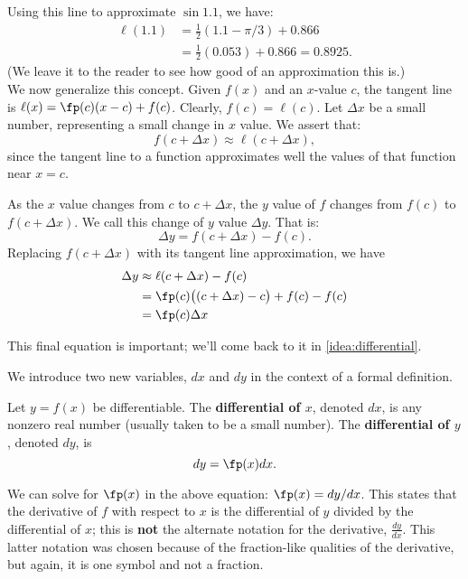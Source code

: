 Using this line to approximate $\sin 1.1$, we have:
\begin{align*}
	\ell(1.1) &= \frac12(1.1-\pi/3)+0.866 \\
					&= \frac12(0.053)+0.866 = 0.8925.
\end{align*}
(We leave it to the reader to see how good of an approximation this is.)\\

We now generalize this concept. Given $f(x)$ and an $x$-value $c$,  the tangent line is $\ell(x) = \fp(c)(x-c)+f(c)$. Clearly, $f(c) = \ell(c)$. Let $\Delta x$ be a small number, representing a small change in $x$ value. We assert that:
\[f(c+\Delta x) \approx \ell(c+\Delta x),\]
since the tangent line to a function approximates well the values of that function near $x=c$. 

As the $x$ value changes from $c$ to $c+\Delta x$, the $y$ value of $f$ changes from $f(c)$ to $f(c+\Delta x)$. We call this change of $y$ value $\Delta y$. That is:
\[\Delta y = f(c+\Delta x)-f(c).\]
Replacing $f(c+\Delta x)$ with its tangent line approximation, we have 
\begin{align}
	\Delta y &\approx \ell(c+\Delta x) - f(c) \notag\\
	&= \fp(c)\big((c+\Delta x)-c\big)+f(c) - f(c)\notag \\
	&=\fp(c)\Delta x		\label{eq:differential}
\end{align}

This final equation is important; we'll come back to it in \autoref{idea:differential}.

We introduce two new variables, $dx$ and $dy$ in the context of a formal definition. %

{Let $y=f(x)$ be differentiable. The \textbf{differential of $x$}, denoted $dx$, is any nonzero real number (usually taken to be a small number). The \textbf{differential of $y$}, denoted $dy$, is
\[dy = \fp(x)dx.\]
}

We can solve for $\fp(x)$ in the above equation: $\fp(x) = dy/dx$. This states that the derivative of $f$ with respect to $x$ is the differential of $y$ divided by the differential of $x$; this is \textbf{not} the alternate notation for the derivative, $\frac{dy}{dx}$. This latter notation was chosen because of the fraction-like qualities of the derivative, but again, it is one symbol and not a fraction.

